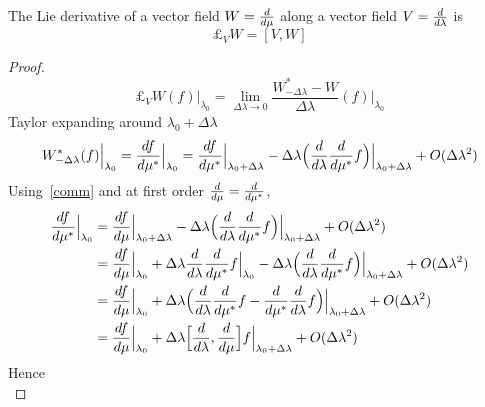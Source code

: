     \begin{definition}
        The Lie derivative of a vector field $W=\frac{d}{d\mu}$ along a vector field $V=\frac{d}{d\lambda}$ is
        \begin{equation}\label{liederfv}
            \pounds_V W = [V, W]
        \end{equation}
    \end{definition}

    \begin{proof}
        \begin{equation*}
            \pounds_V W (f) \vert_{\lambda_0} = \lim_{\Delta \lambda \rightarrow 0} \frac{W^*_{-\Delta\lambda} - W}{\Delta \lambda} (f) \Big \vert_{\lambda_0}
        \end{equation*}
        Taylor expanding around $\lambda_0 + \Delta \lambda$ 
        \begin{equation*}
            W^*_{-\Delta\lambda} (f) \Big \vert_{\lambda_0} = \frac{df}{d\mu^*} \Big \vert_{\lambda_0} = \frac{df}{d\mu^*} \Big \vert_{\lambda_0 + \Delta \lambda} - \Delta \lambda \Big ( \frac{d}{d\lambda} \frac{d}{d\mu^*} f \Big)\Big \vert_{\lambda_0 + \Delta \lambda} + O(\Delta \lambda^2)
        \end{equation*}
        Using~\eqref{comm} and at first order $\frac{d}{d\mu} = \frac{d}{d\mu^*}$,
        \begin{equation*}
        \begin{aligned}
            \frac{df}{d\mu^*} \Big \vert_{\lambda_0} & = \frac{df}{d\mu} \Big \vert_{\lambda_0 + \Delta \lambda} - \Delta \lambda \Big ( \frac{d}{d\lambda} \frac{d}{d\mu^*} f \Big)\Big \vert_{\lambda_0 + \Delta \lambda} + O(\Delta \lambda^2) \\ & = \frac{df}{d\mu} \Big \vert_{\lambda_0} + \Delta \lambda \frac{d}{d\lambda} \frac{d}{d\mu^*} f \Big \vert_{\lambda_0} - \Delta \lambda \Big ( \frac{d}{d\lambda} \frac{d}{d\mu^*} f \Big)\Big \vert_{\lambda_0 + \Delta \lambda} + O(\Delta \lambda^2) \\ & = \frac{df}{d\mu} \Big \vert_{\lambda_0} + \Delta \lambda \Big (\frac{d}{d\lambda} \frac{d}{d\mu^*} f -  \frac{d}{d\mu^*} \frac{d}{d\lambda} f \Big) \Big \vert_{\lambda_0 + \Delta \lambda} + O(\Delta \lambda^2) \\ & = \frac{df}{d\mu} \Big \vert_{\lambda_0} + \Delta \lambda \Big [\frac{d}{d\lambda}, \frac{d}{d\mu} \Big ] f \Big \vert_{\lambda_0 + \Delta \lambda} + O(\Delta \lambda^2)  
        \end{aligned}
        \end{equation*}
        Hence
        \begin{equation*}

\end{equation*}
\end{proof}
